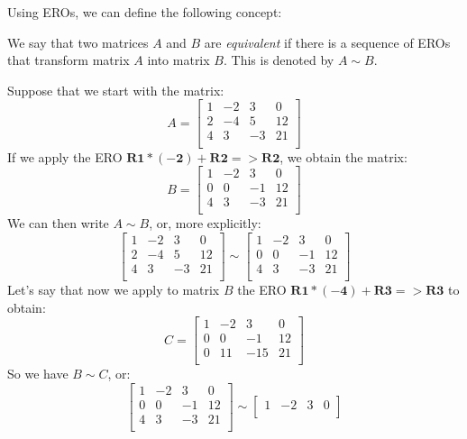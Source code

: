 \documentclass[12pt]{article}
\begin{document}
Using EROs, we can define the following concept:

\begin{definition} We say that two matrices $A$ and $B$ are \emph{equivalent} if there is a sequence of EROs that transform matrix $A$ into matrix $B$. This is denoted by $A\sim B$.
\end{definition}

\begin{example} Suppose that we start with the matrix:
\[
A=\begin{bmatrix}
1 & -2 &  3 &  0\\
2 & -4 &  5 & 12\\
4 &  3 & -3 & 21\\
\end{bmatrix} 
\]
If we apply the ERO $\mathbf{R1*(-2)+R2=>R2}$, we obtain the matrix:
\[
B=\begin{bmatrix}
1 & -2 &  3 &  0\\
0 &  0 & -1 & 12\\
4 &  3 & -3 & 21\\
\end{bmatrix}
\]
We can then write $A\sim B$, or, more explicitly:
\[
\begin{bmatrix}
1 & -2 &  3 &  0\\
2 & -4 &  5 & 12\\
4 &  3 & -3 & 21\\
\end{bmatrix}
\sim
\begin{bmatrix}
1 & -2 &  3 &  0\\
0 &  0 & -1 & 12\\
4 &  3 & -3 & 21\\
\end{bmatrix}
\]
Let's say that now we apply to matrix $B$ the ERO $\mathbf{R1*(-4)+R3=>R3}$ to obtain:
\[
C=\begin{bmatrix}
1 & -2 &  3  &  0\\
0 &  0 & -1  & 12\\
0 & 11 & -15 & 21\\ 
\end{bmatrix}
\]
So we have $B\sim C$, or:
\[
\begin{bmatrix}
1 & -2 &  3 &  0\\
0 &  0 & -1 & 12\\
4 &  3 & -3 & 21\\
\end{bmatrix}
\sim
\begin{bmatrix}
1 & -2 &  3  &  0\\

\end{bmatrix}\]
\end{example}
\end{document}
